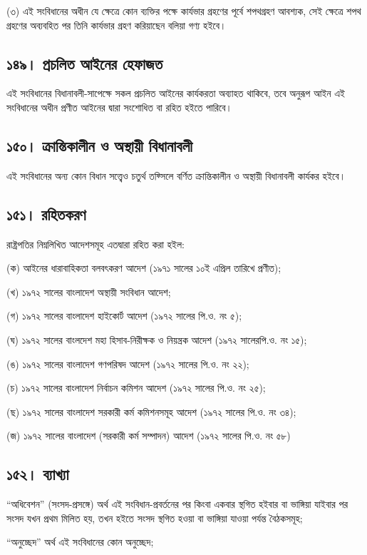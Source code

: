 \documentclass[11pt]{article}
\begin{document}
(৩) এই সংবিধানের অধীন যে ক্ষেত্রে কোন ব্যক্তির পক্ষে কার্যভার গ্রহণের পূর্বে
    শপথগ্রহণ আবশ্যক, সেই ক্ষেত্রে শপথ গ্রহণের অব্যবহিত পর তিনি কার্যভার গ্রহণ
    করিয়াছেন বলিয়া গণ্য হইবে।
\subsection{১৪৯। প্রচলিত আইনের হেফাজত}
\label{sec:org71248fd}
এই সংবিধানের বিধানাবলী-সাপেক্ষে সকল প্রচলিত আইনের কার্যকরতা অব্যাহত
থাকিবে, তবে অনুরূপ আইন এই সংবিধানের অধীন প্রণীত আইনের দ্বারা সংশোধিত বা
রহিত হইতে পারিবে।
\subsection{১৫০। ক্রান্তিকালীন ও অস্থায়ী বিধানাবলী}
\label{sec:orgf06dec5}
এই সংবিধানের অন্য কোন বিধান সত্ত্বেও চতুর্থ তফ্সিলে বর্ণিত ক্রান্তিকালীন ও
অস্থায়ী বিধানাবলী কার্যকর হইবে।
\subsection{১৫১। রহিতকরণ}
\label{sec:orgfe01753}
রাষ্ট্রপতির নিম্নলিখিত আদেশসমূহ এতদ্বারা রহিত করা হইল:

(ক) আইনের ধারাবাহিকতা বলবৎকরণ আদেশ (১৯৭১ সালের ১০ই এপ্রিল তারিখে প্রণীত);

(খ) ১৯৭২ সালের বাংলাদেশ অস্থায়ী সংবিধান আদেশ;

(গ) ১৯৭২ সালের বাংলাদেশ হাইকোর্ট আদেশ (১৯৭২ সালের পি.ও. নং ৫);

(ঘ) ১৯৭২ সালের বাংলদেশ মহা হিসাব-নিরীক্ষক ও নিয়ন্ত্রক আদেশ (১৯৭২ সালেরপি.ও. নং ১৫);

(ঙ) ১৯৭২ সালের বাংলাদেশ গণপরিষদ আদেশ (১৯৭২ সালের পি.ও. নং ২২);

(চ) ১৯৭২ সালের বাংলাদেশ নির্বাচন কমিশন আদেশ (১৯৭২ সালের পি.ও. নং ২৫);

(ছ) ১৯৭২ সালের বাংলাদেশ সরকারী কর্ম কমিশনসমূহ আদেশ (১৯৭২ সালের পি.ও. নং ৩৪);

(জ) ১৯৭২ সালের বাংলাদেশ (সরকারী কর্ম সম্পাদন) আদেশ (১৯৭২ সালের পি.ও. নং ৫৮)

\subsection{১৫২। ব্যাখ্যা}
\label{sec:org86cc91d}

“অধিবেশন” (সংসদ-প্রসঙ্গে) অর্থ এই সংবিধান-প্রবর্তনের পর কিংবা একবার স্থগিত
হইবার বা ভাঙ্গিয়া যাইবার পর সংসদ যখন প্রথম মিলিত হয়, তখন হইতে সংসদ স্থগিত
হওয়া বা ভাঙ্গিয়া যাওয়া পর্যন্ত বৈঠকসমূহ;

“অনুচ্ছেদ” অর্থ এই সংবিধানের কোন অনুচ্ছেদ;
\end{document}
